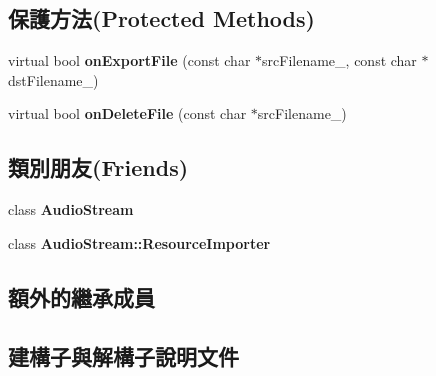 \subsection*{保護方法(Protected Methods)}
\begin{DoxyCompactItemize}
\item 
virtual bool {\bfseries on\+Export\+File} (const char $\ast$src\+Filename\+\_\+, const char $\ast$dst\+Filename\+\_\+)\hypertarget{class_magnum_1_1_audio_stream_1_1_resource_importer_abf2f66c585add989c23ce2b1aa2d27ac}{}\label{class_magnum_1_1_audio_stream_1_1_resource_importer_abf2f66c585add989c23ce2b1aa2d27ac}

\item 
virtual bool {\bfseries on\+Delete\+File} (const char $\ast$src\+Filename\+\_\+)\hypertarget{class_magnum_1_1_audio_stream_1_1_resource_importer_a5b148d8a6cc10607281061de593d9798}{}\label{class_magnum_1_1_audio_stream_1_1_resource_importer_a5b148d8a6cc10607281061de593d9798}

\end{DoxyCompactItemize}
\subsection*{類別朋友(Friends)}
\begin{DoxyCompactItemize}
\item 
class {\bfseries Audio\+Stream}\hypertarget{class_magnum_1_1_audio_stream_1_1_resource_importer_ac4a5eaa8965a8497bcd8eb0384abb928}{}\label{class_magnum_1_1_audio_stream_1_1_resource_importer_ac4a5eaa8965a8497bcd8eb0384abb928}

\item 
class {\bfseries Audio\+Stream\+::\+Resource\+Importer}\hypertarget{class_magnum_1_1_audio_stream_1_1_resource_importer_a7ea5549cc5178c1bd5b514eba614fadb}{}\label{class_magnum_1_1_audio_stream_1_1_resource_importer_a7ea5549cc5178c1bd5b514eba614fadb}

\end{DoxyCompactItemize}
\subsection*{額外的繼承成員}


\subsection{建構子與解構子說明文件}
